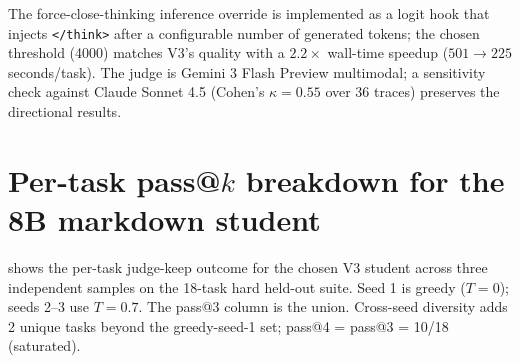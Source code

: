 \documentclass[11pt]{article}
\begin{document}
The force-close-thinking inference override is implemented as a logit hook that injects \texttt{</think>} after a configurable number of generated tokens; the chosen threshold (4000) matches V3's quality with a $2.2\times$ wall-time speedup ($501 \to 225$ seconds/task). The judge is Gemini 3 Flash Preview multimodal; a sensitivity check against Claude Sonnet 4.5 (Cohen's $\kappa = 0.55$ over 36 traces) preserves the directional results.

\section{Per-task pass@\texorpdfstring{$k$}{k} breakdown for the 8B markdown student}
\label{app:per-task-md}

 shows the per-task judge-keep outcome for the chosen V3 student across three independent samples on the 18-task hard held-out suite. Seed 1 is greedy ($T{=}0$); seeds 2--3 use $T{=}0.7$. The pass@3 column is the union. Cross-seed diversity adds 2 unique tasks beyond the greedy-seed-1 set; pass@4 = pass@3 = 10/18 (saturated).
\end{document}
